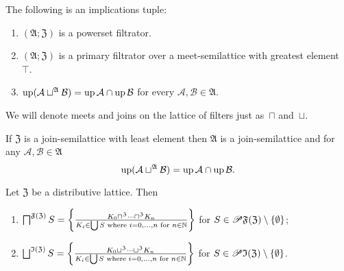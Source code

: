 \begin{cor}
The following is an implications tuple:
\begin{enumerate}
\item $(\mathfrak{A};\mathfrak{Z})$ is a powerset filtrator.
\item $(\mathfrak{A};\mathfrak{Z})$ is a primary filtrator over a meet-semilattice
with greatest element~$\top$.
\item $\operatorname{up}(\mathcal{A}\sqcup^{\mathfrak{A}}\mathcal{B})=\operatorname{up}\mathcal{A}\cap\operatorname{up}\mathcal{B}$
for every $\mathcal{A},\mathcal{B}\in\mathfrak{A}$.
\end{enumerate}
\end{cor}
We will denote meets and joins on the lattice of filters just as~$\sqcap$
and~$\sqcup$.
\begin{cor}
If $\mathfrak{Z}$ is a join-semilattice with least element then $\mathfrak{A}$ is a
join-semilattice and for any $\mathcal{A},\mathcal{B}\in\mathfrak{A}$
\[
\operatorname{up}(\mathcal{A}\sqcup^{\mathfrak{A}}\mathcal{B})=\operatorname{up}\mathcal{A}\cap\operatorname{up}\mathcal{B}.
\]
\end{cor}
\begin{thm}
Let $\mathfrak{Z}$ be a distributive lattice. Then
\begin{enumerate}
\item $\bigsqcap^{\mathfrak{F}(\mathfrak{Z})}S=\left\{ \frac{K_{0}\sqcap^{\mathfrak{Z}}\dots\sqcap^{\mathfrak{Z}}K_{n}}{K_{i}\in\bigcup S\text{ where }i=0,\dots,n\text{ for }n\in\mathbb{N}}\right\}$
for $S\in\mathscr{P}\mathfrak{F}(\mathfrak{Z})\setminus\{\emptyset\}$;
\item $\bigsqcup^{\mathfrak{I}(\mathfrak{Z})}S=\left\{ \frac{K_{0}\sqcup^{\mathfrak{Z}}\dots\sqcup^{\mathfrak{Z}}K_{n}}{K_{i}\in\bigcup S\text{ where }i=0,\dots,n\text{ for }n\in\mathbb{N}}\right\}$
for $S\in\mathscr{P}\mathfrak{I}(\mathfrak{Z})\setminus\{\emptyset\}$.
\end{enumerate}
\end{thm}
